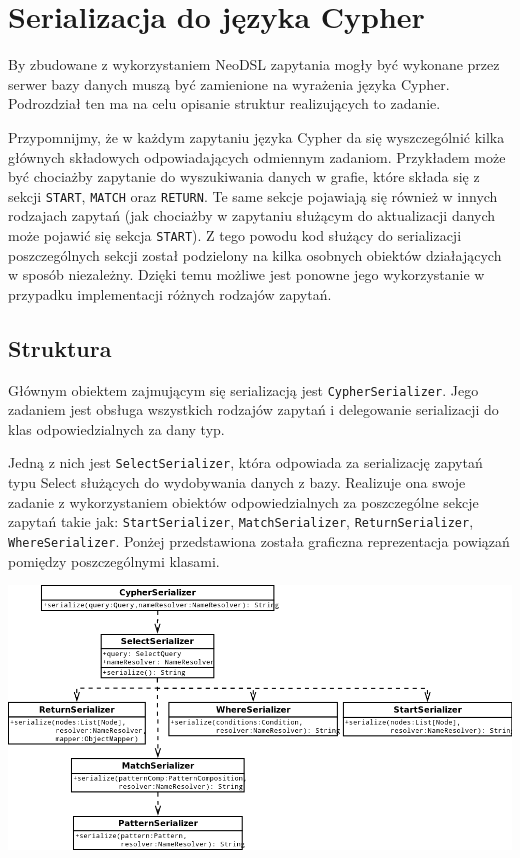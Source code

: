 \documentclass[brudnopis]{xmgr}
\begin{document}
\section{Serializacja do języka Cypher}

By zbudowane z wykorzystaniem NeoDSL zapytania mogły być wykonane przez serwer bazy danych muszą być zamienione na wyrażenia języka Cypher. Podrozdział ten ma na celu opisanie struktur realizujących to zadanie. 

Przypomnijmy, że w każdym zapytaniu języka Cypher da się wyszczególnić kilka głównych składowych odpowiadających odmiennym zadaniom. Przykładem może być chociażby zapytanie do wyszukiwania danych w grafie, które składa się z sekcji \texttt{START}, \texttt{MATCH} oraz \texttt{RETURN}. Te same sekcje pojawiają się również w innych rodzajach zapytań (jak chociażby w zapytaniu służącym do aktualizacji danych może pojawić się sekcja \texttt{START}). Z tego powodu kod służący do serializacji poszczególnych sekcji został podzielony na kilka osobnych obiektów działających w sposób niezależny. Dzięki temu możliwe jest ponowne jego wykorzystanie w przypadku implementacji różnych rodzajów zapytań.

\subsection{Struktura}

Głównym obiektem zajmującym się serializacją jest \texttt{CypherSerializer}. Jego zadaniem jest obsługa wszystkich rodzajów zapytań i delegowanie serializacji do klas odpowiedzialnych za dany typ.

Jedną z nich jest \texttt{SelectSerializer}, która odpowiada za serializację zapytań typu Select służących do wydobywania danych z bazy. Realizuje ona swoje zadanie z wykorzystaniem obiektów odpowiedzialnych za poszczególne sekcje zapytań takie jak: \texttt{StartSerializer}, \texttt{MatchSerializer}, \texttt{ReturnSerializer}, \texttt{WhereSerializer}. Ponżej przedstawiona została graficzna reprezentacja powiązań pomiędzy poszczególnymi klasami.

\includegraphics[scale=0.5]{images/cypher-serialization-uml.png}
\end{document}
